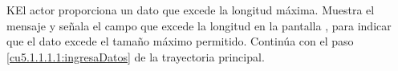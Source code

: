  \begin{UCtrayectoriaA}{K}{El actor proporciona un dato que excede la longitud máxima.}
    \UCpaso[\UCsist] Muestra el mensaje  y señala el campo que excede la 
    longitud en la pantalla , para indicar que el dato excede el tamaño máximo permitido.
    \UCpaso[] Continúa con el paso \ref{cu5.1.1.1.1:ingresaDatos} de la trayectoria principal.
 \end{UCtrayectoriaA}

  